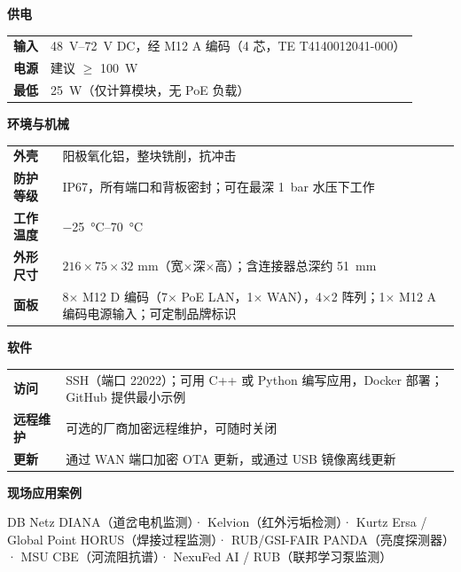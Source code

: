 \documentclass[10pt,a4paper]{article}
\begin{document}
\begin{minipage}[t]{0.48\textwidth}
\textbf{供电}\par\vspace{1mm}
\begin{tabularx}{\textwidth}{@{}>{\bfseries}p{2.9cm}X@{}}
\toprule
输入 & \SIrange{48}{72}{V} DC，经 M12 A 编码（4 芯，TE T4140012041-000）\\
电源 & 建议 $\geq$ \SI{100}{W} \\
最低 & \SI{25}{W}（仅计算模块，无 PoE 负载）\\
\bottomrule
\end{tabularx}

\vspace{2mm}
\textbf{环境与机械}\par\vspace{1mm}
\begin{tabularx}{\textwidth}{@{}>{\bfseries}p{2.9cm}X@{}}
\toprule
外壳 & 阳极氧化铝，整块铣削，抗冲击 \\
防护等级 & IP67，所有端口和背板密封；可在最深 \SI{1}{bar} 水压下工作 \\
工作温度 & \SIrange{-25}{70}{\celsius} \\
外形尺寸 & $216 \times 75 \times 32$ \si{mm}（宽$\times$深$\times$高）；含连接器总深约 \SI{51}{mm} \\
面板 & 8$\times$ M12 D 编码（7$\times$ PoE LAN，1$\times$ WAN），4$\times$2 阵列；1$\times$ M12 A 编码电源输入；可定制品牌标识 \\
\bottomrule
\end{tabularx}

\vspace{2mm}
\textbf{软件}\par\vspace{1mm}
\begin{tabularx}{\textwidth}{@{}>{\bfseries}p{2.9cm}X@{}}
\toprule
访问 & SSH（端口 22022）；可用 C++ 或 Python 编写应用，Docker 部署；GitHub 提供最小示例 \\
远程维护 & 可选的厂商加密远程维护，可随时关闭 \\
更新 & 通过 WAN 端口加密 OTA 更新，或通过 USB 镜像离线更新 \\
\bottomrule
\end{tabularx}

\vspace{2mm}
\textbf{现场应用案例}\par\vspace{1mm}
{\small DB Netz DIANA（道岔电机监测）· Kelvion（红外污垢检测）· Kurtz Ersa / Global Point HORUS（焊接过程监测）· RUB/GSI-FAIR PANDA（亮度探测器）· MSU CBE（河流阻抗谱）· NexuFed AI / RUB（联邦学习泵监测）}
\end{minipage}
\end{document}
